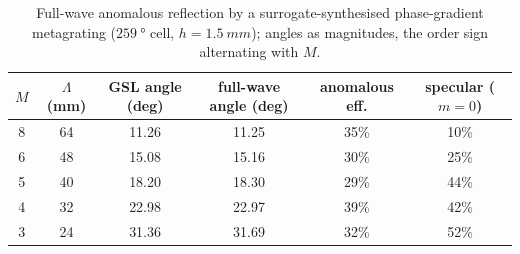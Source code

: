 \documentclass[11pt]{article}
\begin{document}
\begin{table}[!ht]\centering\small
\caption{Full-wave anomalous reflection by a surrogate-synthesised phase-gradient metagrating
($\SI{259}{\degree}$ cell, $h=\SI{1.5}{mm}$); angles as magnitudes, the order sign alternating with $M$.}
\label{tab:steer}
\begin{tabular}{cccccc}
\toprule
$M$ & $\Lambda$ (mm) & GSL angle (deg) & full-wave angle (deg) & anomalous eff. & specular ($m{=}0$) \\
\midrule
8 & 64 & 11.26 & 11.25 & 35\% & 10\% \\
6 & 48 & 15.08 & 15.16 & 30\% & 25\% \\
5 & 40 & 18.20 & 18.30 & 29\% & 44\% \\
4 & 32 & 22.98 & 22.97 & 39\% & 42\% \\
3 & 24 & 31.36 & 31.69 & 32\% & 52\% \\
\bottomrule
\end{tabular}
\end{table}
\end{document}
